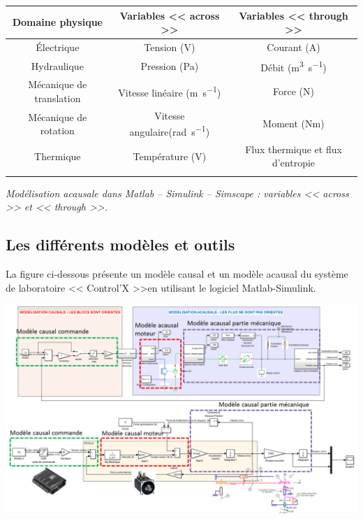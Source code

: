 \documentclass[10pt,fleqn]{article} %
\begin{document}
\begin{center}
\begin{tabular}{ccc}
\hline
Domaine physique & Variables << across >> &  Variables << through >> \\ \hline\hline
Électrique & Tension (\si{V})& Courant (\si{A})\\ \hline
Hydraulique & Pression (\si{Pa})& Débit (\si{m^3.s^{-1}})\\ \hline
Mécanique de translation & Vitesse linéaire (\si{m.s^{-1}})& Force (\si{N})\\ \hline 
Mécanique de rotation & Vitesse angulaire(\si{rad.s^{-1}}) & Moment (\si{Nm})\\ \hline
Thermique & Température (V)& Flux thermique et flux d'entropie \\ \hline
\\
\end{tabular}

\textit{Modélisation acausale dans Matlab -- Simulink -- Simscape : variables << across >> et << through >>.}
\end{center}

\subsection{Les différents modèles et outils}

La figure ci-dessous présente un modèle causal et un modèle acausal du système de laboratoire << Control'X >>en utilisant le logiciel Matlab-Simulink.

\begin{center}
\includegraphics[width=\linewidth]{images/Modeles}
\end{center}
\end{document}
